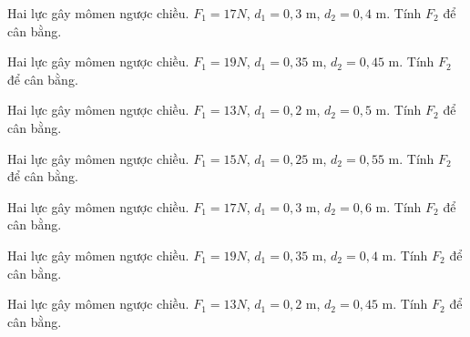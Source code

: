 \begin{ex}
Hai lực gây mômen ngược chiều. $F_1=17N$, $d_1=0,3$ m, $d_2=0,4$ m. Tính $F_2$ để cân bằng.
\end{ex}

\begin{ex}
Hai lực gây mômen ngược chiều. $F_1=19N$, $d_1=0,35$ m, $d_2=0,45$ m. Tính $F_2$ để cân bằng.
\end{ex}

\begin{bt}
Hai lực gây mômen ngược chiều. $F_1=13N$, $d_1=0,2$ m, $d_2=0,5$ m. Tính $F_2$ để cân bằng.
\end{bt}

\begin{bt}
Hai lực gây mômen ngược chiều. $F_1=15N$, $d_1=0,25$ m, $d_2=0,55$ m. Tính $F_2$ để cân bằng.
\end{bt}

\begin{bt}
Hai lực gây mômen ngược chiều. $F_1=17N$, $d_1=0,3$ m, $d_2=0,6$ m. Tính $F_2$ để cân bằng.
\end{bt}

\begin{bt}
Hai lực gây mômen ngược chiều. $F_1=19N$, $d_1=0,35$ m, $d_2=0,4$ m. Tính $F_2$ để cân bằng.
\end{bt}

\begin{bt}
Hai lực gây mômen ngược chiều. $F_1=13N$, $d_1=0,2$ m, $d_2=0,45$ m. Tính $F_2$ để cân bằng.
\end{bt}

